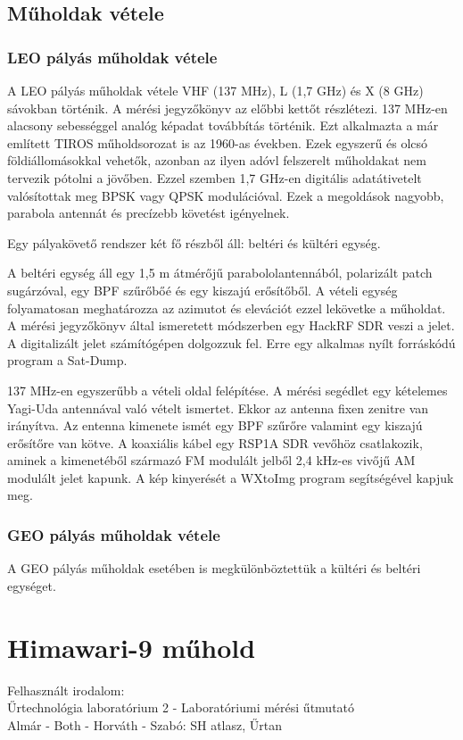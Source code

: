 \documentclass[a4paper,11pt]{article}
\begin{document}
\subsection*{Műholdak vétele}

\subsubsection*{LEO pályás műholdak vétele}

A LEO pályás műholdak vétele VHF (137 MHz), L (1,7 GHz) és X (8 GHz) sávokban történik. A mérési jegyzőkönyv az előbbi kettőt részlétezi.
137 MHz-en alacsony sebességgel analóg képadat továbbítás történik. Ezt alkalmazta a már említett TIROS műholdsorozat is az 1960-as években. Ezek egyszerű és olcsó földiállomásokkal vehetők, azonban az ilyen adóvl felszerelt műholdakat nem tervezik pótolni a jövőben.
Ezzel szemben 1,7 GHz-en digitális adatátivetelt valósítottak meg BPSK vagy QPSK modulációval. Ezek a megoldások nagyobb, parabola antennát és precízebb követést igényelnek.

Egy pályakövető rendszer két fő részből áll: beltéri és kültéri egység.

A beltéri egység áll egy 1,5 m átmérőjű parabololantennából, polarizált patch sugárzóval, egy BPF szűrőbőé és egy kiszajú erősítőből.
A vételi egység folyamatosan meghatározza az azimutot és elevációt ezzel lekövetke a műholdat.
A mérési jegyzőkönyv által ismeretett módszerben egy HackRF SDR veszi a jelet. A digitalizált jelet számítógépen dolgozzuk fel. Erre egy alkalmas nyílt forráskódú program a Sat-Dump.

137 MHz-en egyszerűbb a vételi oldal felépítése. A mérési segédlet egy kételemes Yagi-Uda antennával való vételt ismertet. Ekkor az antenna fixen zenitre van irányítva. Az entenna kimenete ismét egy BPF szűrőre valamint
egy kiszajú erősítőre van kötve. A koaxiális kábel egy RSP1A SDR vevőhöz csatlakozik, aminek a kimenetéből származó FM modulált jelből 2,4 kHz-es vivőjű AM modulált jelet kapunk. A kép kinyerését a WXtoImg program segítségével kapjuk meg.

\subsubsection*{GEO pályás műholdak vétele}
A GEO pályás műholdak esetében is megkülönböztettük a kültéri és beltéri egységet.

\section*{Himawari-9 műhold}

Felhasznált irodalom:\\
Űrtechnológia laboratórium 2 - Laboratóriumi mérési űtmutató\\
Almár - Both - Horváth - Szabó: SH atlasz, Űrtan
\end{document}
